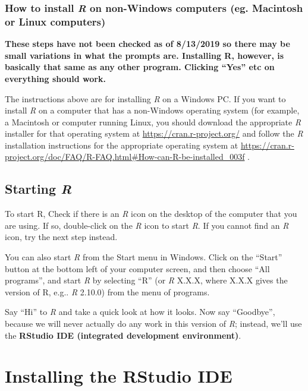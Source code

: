 \documentclass[
]{book}
\begin{document}
\hypertarget{how-to-install-r-on-non-windows-computers-eg.-macintosh-or-linux-computers}{%
\subsection{\texorpdfstring{How to install \emph{R} on non-Windows computers (eg. Macintosh or Linux computers)}{How to install R on non-Windows computers (eg. Macintosh or Linux computers)}}\label{how-to-install-r-on-non-windows-computers-eg.-macintosh-or-linux-computers}}

\textbf{These steps have not been checked as of 8/13/2019 so there may be small variations in what the prompts are. Installing R, however, is basically that same as any other program. Clicking ``Yes'' etc on everything should work.}

The instructions above are for installing \emph{R} on a Windows PC. If you want to install \emph{R} on a computer that has a non-Windows operating system (for example, a Macintosh or computer running Linux, you should download the appropriate \emph{R} installer for that operating system at \url{https://cran.r-project.org/} and follow the \emph{R} installation instructions for the appropriate operating system at \url{https://cran.r-project.org/doc/FAQ/R-FAQ.html\#How-can-R-be-installed_003f} .

\hypertarget{starting-r}{%
\section{\texorpdfstring{Starting \emph{R}}{Starting R}}\label{starting-r}}

To start R, Check if there is an \emph{R} icon on the desktop of the computer that you are using. If so, double-click on the \emph{R} icon to start \emph{R}. If you cannot find an \emph{R} icon, try the next step instead.

You can also start \emph{R} from the Start menu in Windows. Click on the ``Start'' button at the bottom left of your computer screen, and then choose ``All programs'', and start \emph{R} by selecting ``R'' (or \emph{R} X.X.X, where X.X.X gives the version of R, e.g.. \emph{R} 2.10.0) from the menu of programs.

Say ``Hi'' to \emph{R} and take a quick look at how it looks. Now say ``Goodbye'', because we will never actually do any work in this version of \emph{R}; instead, we'll use the \textbf{RStudio IDE (integrated development environment)}.

\hypertarget{installing-the-rstudio-ide}{%
\chapter{Installing the RStudio IDE}\label{installing-the-rstudio-ide}}
\end{document}
